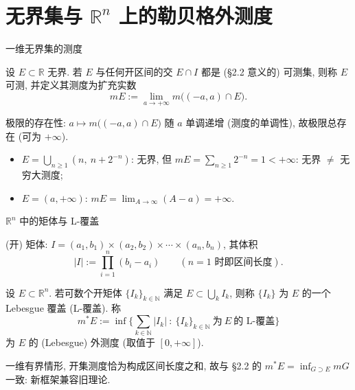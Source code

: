 
\section[$\mathbb{R}^n$ 外测度]{无界集与 $\mathbb{R}^n$ 上的勒贝格外测度}


\begin{frame}{一维无界集的测度}

\begin{Def}[无界可测集]
设 $E \subset \mathbb{R}$ 无界. 若 $E$ 与任何开区间的交 $E \cap I$ 都是 (§2.2 意义的) 可测集, 则称 $E$ \alert{可测}, 并定义其测度为\alert{扩充实数}
\[
mE := \lim_{a \to +\infty} m\big(( -a, a) \cap E\big).
\]
\end{Def}

\pause

极限的存在性: $a \mapsto m\big((-a, a) \cap E\big)$ 随 $a$ \alert{单调递增} (测度的单调性), 故极限总存在 (可为 $+\infty$).

\pause

\begin{eg}
\begin{itemize}
\item $E = \bigcup_{n \geqslant 1} \left(n,\ n + 2^{-n}\right)$: 无界, 但
$mE = \sum_{n \geqslant 1} 2^{-n} = 1 < +\infty$: \alert{无界 $\neq$ 无穷大测度};
\item $E = (a, +\infty)$: $mE = \lim_{A \to \infty} (A - a) = +\infty$.
\end{itemize}
\end{eg}

\end{frame}


\begin{frame}{$\mathbb{R}^n$ 中的矩体与 L-覆盖}

\begin{Def}[矩体]
\alert{ (开) 矩体}: $I = (a_1, b_1) \times (a_2, b_2) \times \cdots \times (a_n, b_n)$, 其\alert{体积}
\[
|I| := \prod_{i=1}^n (b_i - a_i)
\qquad (n = 1 \text{ 时即区间长度}).
\]
\end{Def}

\pause

\begin{Def}[L-覆盖与外测度]
设 $E \subset \mathbb{R}^n$. 若可数个开矩体 $\{I_k\}_{k \in \mathbb{N}}$ 满足 $E \subset \bigcup_{k} I_k$, 则称 $\{I_k\}$ 为 $E$ 的一个 \alert{Lebesgue 覆盖} (L-覆盖). 称
\[
m^* E := \inf \Big\{ \sum_{k \in \mathbb{N}} |I_k| \ :\ \{I_k\}_{k \in \mathbb{N}}\ \text{为}\ E\ \text{的 L-覆盖} \Big\}
\]
为 $E$ 的\alert{ (Lebesgue) 外测度} (取值于 $[0, +\infty]$).
\end{Def}

\pause

\begin{remark}
一维有界情形, 开集测度恰为构成区间长度之和, 故与 §2.2 的 $m^*E = \inf_{G \supset E} mG$ \alert{一致}: 新框架兼容旧理论.
\end{remark}

\end{frame}

